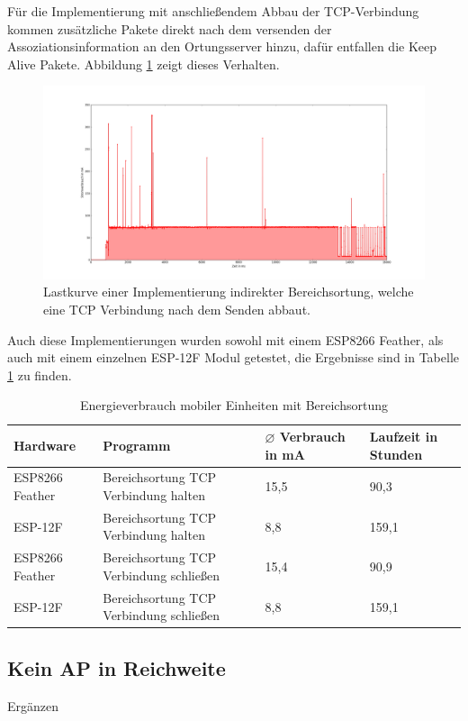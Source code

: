 Für die Implementierung mit anschließendem Abbau der TCP-Verbindung kommen zusätzliche Pakete direkt nach dem versenden der Assoziationsinformation an den Ortungsserver hinzu, dafür entfallen die Keep Alive Pakete.
Abbildung \ref{fig:tcpdisco} zeigt dieses Verhalten.\\

\begin{figure}[h!]
  \centering
	\includegraphics[width=\textwidth]{plots/tcpdisco.png}
  \caption{Lastkurve einer Implementierung indirekter Bereichsortung, welche eine TCP Verbindung nach dem Senden abbaut.}
  \label{fig:tcpdisco}
\end{figure}

Auch diese Implementierungen wurden sowohl mit einem ESP8266 Feather, als auch mit einem einzelnen ESP-12F Modul getestet, die Ergebnisse sind in Tabelle \ref{table:associatonina} zu finden.

\begin{table}[h!]
	\centering
	\caption{Energieverbrauch mobiler Einheiten mit Bereichsortung}
	\label{table:associatonina}
	\begin{tabular}{p{3.5cm}|p{5cm}|p{2.5cm}|p{2.5cm}}
		Hardware & Programm & $\varnothing$ Verbrauch in mA & Laufzeit in Stunden\\
		\hline
		ESP8266 Feather & Bereichsortung TCP Verbindung halten & 15,5 & 90,3\\
		ESP-12F & Bereichsortung TCP Verbindung halten & 8,8 & 159,1\\
		ESP8266 Feather & Bereichsortung TCP Verbindung schließen & 15,4 & 90,9\\
		ESP-12F & Bereichsortung TCP Verbindung schließen & 8,8 & 159,1\\
	\end{tabular}
\end{table}

\subsection{Kein AP in Reichweite}
Ergänzen


